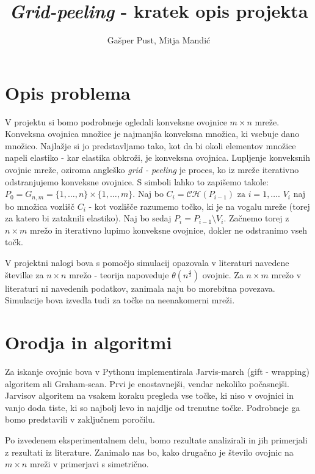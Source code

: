 \documentclass[a4paper]{article}
\title{\textit{Grid-peeling} - kratek opis projekta}
\author{Gašper Pust, Mitja Mandić}
\begin{document}
\begin{titlepage}
 \maketitle
\end{titlepage}
%

\section{Opis problema}
V projektu si bomo podrobneje ogledali konveksne ovojnice $m \times n$ mreže. Konveksna ovojnica množice je najmanjša konveksna množica, ki vsebuje dano množico.
Najlažje si jo predstavljamo tako, kot da bi okoli elementov množice napeli elastiko - kar elastika obkroži, je konveksna ovojnica. Lupljenje konveksnih ovojnic mreže,
oziroma angleško \textit{grid - peeling} je proces, ko iz mreže iterativno odstranjujemo konveksne ovojnice. S simboli lahko to zapišemo takole:
$ P_{0} = G_{n,m} = \{1,\ldots, n\} \times \{1, \ldots, m\}$. Naj bo $C_{i} = \mathcal{C}\mathcal{H}(P_{i-1}) \text{ za } i = 1, \ldots$. $V_{i}$ naj bo množica vozlišč $C_{i}$
- kot vozlišče razumemo točko, ki je na vogalu mreže (torej za katero bi zataknili elastiko). Naj bo sedaj $P_{i} = P_{i-1} \setminus V_{i}$. Začnemo torej z $n \times m$ mrežo 
in iterativno lupimo konveksne ovojnice, dokler ne odstranimo vseh točk.

V projektni nalogi bova s pomočjo simulacij opazovala v literaturi navedene številke za $n \times n$ mrežo - teorija napoveduje $\theta(n ^ \frac{4}{3})$ ovojnic.
Za $n \times m$ mrežo v literaturi ni navedenih podatkov, zanimala naju bo morebitna povezava. Simulacije bova izvedla tudi za točke na neenakomerni mreži.

\section{Orodja in algoritmi}
Za iskanje ovojnic bova v Pythonu implementirala Jarvis-march (gift - wrapping) algoritem ali Graham-scan. Prvi je enostavnejši, vendar nekoliko počasnejši.
Jarvisov algoritem na vsakem koraku pregleda vse točke, ki niso v ovojnici in vanjo doda tiste, ki so najbolj levo in najdlje od trenutne točke. Podrobneje ga
bomo predstavili v zaključnem poročilu.

Po izvedenem eksperimentalnem delu, bomo rezultate analizirali in jih primerjali z rezultati iz literature. Zanimalo nas bo, kako drugačno je število ovojnic na $m \times n$
mreži v primerjavi s simetrično.
\end{document}
